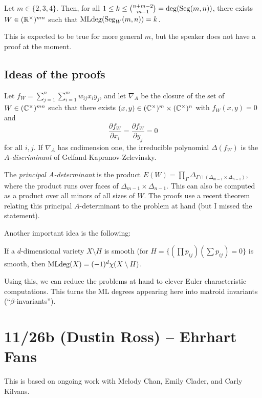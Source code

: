 \documentclass{amsart}
\begin{document}
\begin{thm}
	Let $m \in \{2, 3, 4\}$.
	Then, for all $1 \leq k \leq \binom{n+m-2}{m-1} = \deg(\operatorname{Seg}(m,n))$, there exists $W \in (\mathbb{R}^{\times})^{mn}$ such that $\operatorname{MLdeg}(\operatorname{Seg}_W(m,n)) = k$.
\end{thm}

This is expected to be true for more general $m$, but the speaker does not have a proof at the moment.

\subsection{Ideas of the proofs}

Let $f_W = \sum_{j=1}^n \sum_{i=1}^m w_{ij} x_i y_j$, and let $\nabla_A$ be the closure of the set of $W \in (\mathbb{C}^\times)^{mn}$ such that there exists $(x,y) \in (\mathbb{C}^\times)^m \times (\mathbb{C}^\times)^n$ with $f_W(x,y) = 0$ and 
\[
	\frac{\partial f_W}{\partial x_i} = \frac{\partial f_W}{\partial y_j} = 0
\]
for all $i, j$.
If $\nabla_A$ has codimension one, the irreducible polynomial $\Delta(f_W)$ is the \emph{$A$-discriminant} of Gelfand-Kapranov-Zelevinsky.

The \emph{principal $A$-determinant} is the product $E(W) = \prod_{\Gamma} \Delta_{\Gamma \cap (\Delta_{m-1} \times \Delta_{n-1})}$, where the product runs over faces of $\Delta_{m-1} \times \Delta_{n-1}$.
This can also be computed as a product over all minors of all sizes of $W$.
The proofs use a recent theorem relating this principal $A$-determinant to the problem at hand (but I missed the statement).

Another important idea is the following:

\begin{thm}[Huh]
	If a $d$-dimensional variety $X \setminus H$ is smooth (for $H = \{ (\prod p_{ij}) (\sum p_{ij}) = 0\}$ is smooth, then $\operatorname{MLdeg}(X) = (-1)^d \chi(X \setminus H)$.
\end{thm}

Using this, we can reduce the problems at hand to clever Euler characteristic computations.
This turns the ML degrees appearing here into matroid invariants (``$\beta$-invariants'').

\section{11/26b (Dustin Ross) -- Ehrhart Fans}

This is based on ongoing work with Melody Chan, Emily Clader, and Carly Kilvans.
\end{document}

